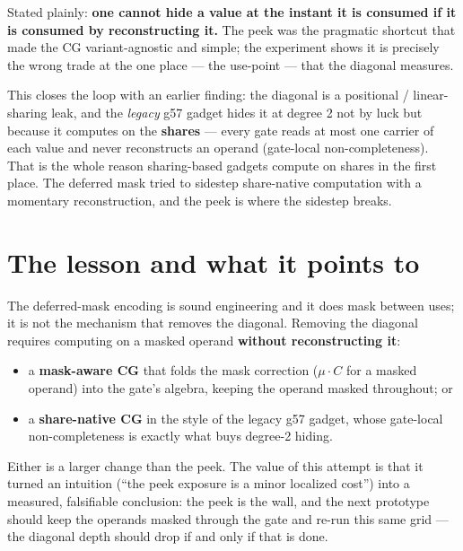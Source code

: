 \documentclass[11pt]{article}
\begin{document}
Stated plainly: \textbf{one cannot hide a value at the instant it is consumed
if it is consumed by reconstructing it.} The peek was the pragmatic shortcut
that made the CG variant-agnostic and simple; the experiment shows it is
precisely the wrong trade at the one place --- the use-point --- that the
diagonal measures.

This closes the loop with an earlier finding: the diagonal is a positional /
linear-sharing leak, and the \emph{legacy} g57 gadget hides it at degree 2
not by luck but because it computes on the \textbf{shares} --- every gate
reads at most one carrier of each value and never reconstructs an operand
(gate-local non-completeness). That is the whole reason sharing-based gadgets
compute on shares in the first place. The deferred mask tried to sidestep
share-native computation with a momentary reconstruction, and the peek is
where the sidestep breaks.

\section{The lesson and what it points to}

The deferred-mask encoding is sound engineering and it does mask between
uses; it is not the mechanism that removes the diagonal. Removing the
diagonal requires computing on a masked operand \textbf{without reconstructing
it}:

\begin{itemize}
\item a \textbf{mask-aware CG} that folds the mask correction ($\mu \cdot C$
for a masked operand) into the gate's algebra, keeping the operand masked
throughout; or
\item a \textbf{share-native CG} in the style of the legacy g57 gadget, whose
gate-local non-completeness is exactly what buys degree-2 hiding.
\end{itemize}

Either is a larger change than the peek. The value of this attempt is that it
turned an intuition (``the peek exposure is a minor localized cost'') into a
measured, falsifiable conclusion: the peek is the wall, and the next
prototype should keep the operands masked through the gate and re-run this
same grid --- the diagonal depth should drop if and only if that is done.
\end{document}
